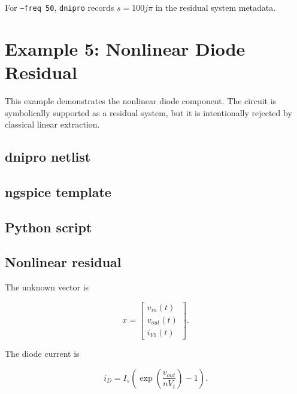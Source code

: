 \documentclass[11pt,a4paper]{article}
\newcommand{\project}{\texttt{dnipro}}
\newcommand{\code}[1]{\texttt{#1}}
\begin{document}
For \code{--freq 50}, \project{} records \(s = 100j\pi\) in the residual system
metadata.

\section{Example 5: Nonlinear Diode Residual}
\label{sec:ex-diode-nonlinear}

This example demonstrates the nonlinear diode component. The circuit is
symbolically supported as a residual system, but it is intentionally rejected by
classical linear extraction.

\subsection{dnipro netlist}



\subsection{ngspice template}



\subsection{Python script}



\subsection{Nonlinear residual}

The unknown vector is

\begin{equation}
    x =
    \begin{bmatrix}
        v_{in}(t) \\
        v_{out}(t) \\
        i_{V1}(t)
    \end{bmatrix}.
\end{equation}

The diode current is

\begin{equation}
    i_D =
    I_s\left(\exp\!\left(\frac{v_{out}}{nV_t}\right)-1\right).
\end{equation}
\end{document}
